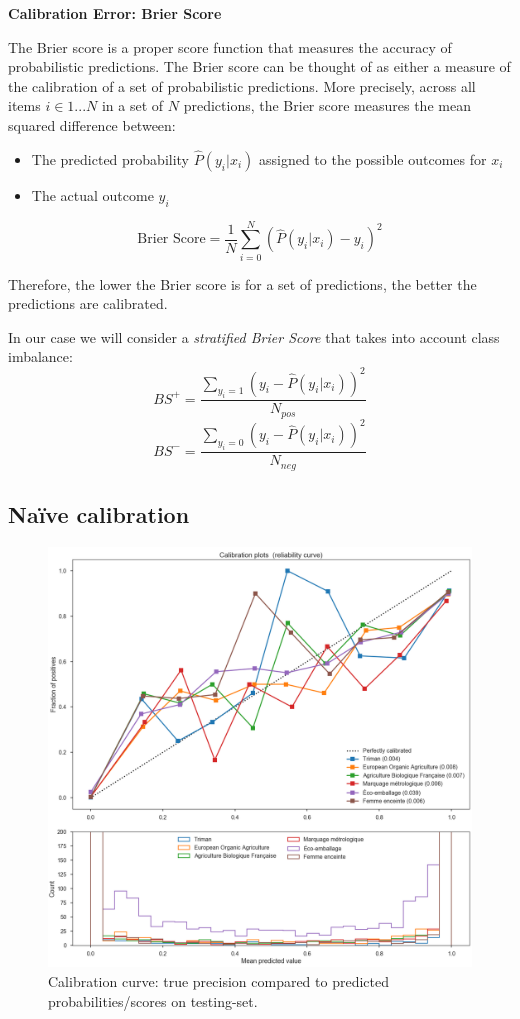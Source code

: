 \textbf{Calibration Error: Brier Score}

The Brier score is a proper score function that measures the accuracy of probabilistic predictions. The Brier score can be thought of as either a measure of the calibration of a set of probabilistic predictions. More precisely, across all items $i\in{1...N}$ in a set of $N$ predictions, the Brier score measures the mean squared difference between:
\begin{itemize}
    \item The predicted probability $\hat{P}(y_i|x_i)$ assigned to the possible outcomes for $x_i$
    \item The actual outcome $y_i$
\end{itemize}
$$\text{Brier Score} = \frac{1}{N} \sum \limits_{i=0}^N (\hat{P}(y_i|x_i) - y_i)^2$$

Therefore, the lower the Brier score is for a set of predictions, the better the predictions are calibrated. \cite{wiki15, Ya91}

In our case we will consider a \textit{stratified Brier Score} that takes into account class imbalance:
$$BS^+ = \frac{\sum \limits_{y_i=1} (y_i - \hat{P}(y_i|x_i))^2}{N_{pos}}$$
$$BS^- = \frac{\sum \limits_{y_i=0} (y_i - \hat{P}(y_i|x_i))^2}{N_{neg}}$$


\subsection{Naïve calibration}

\begin{figure}[H]
\centering
\includegraphics[scale=0.37]{./images/calibration/islabeledby_calibration_curve.png}
\caption{Calibration curve: true precision compared to predicted probabilities/scores on testing-set.}
\end{figure}

